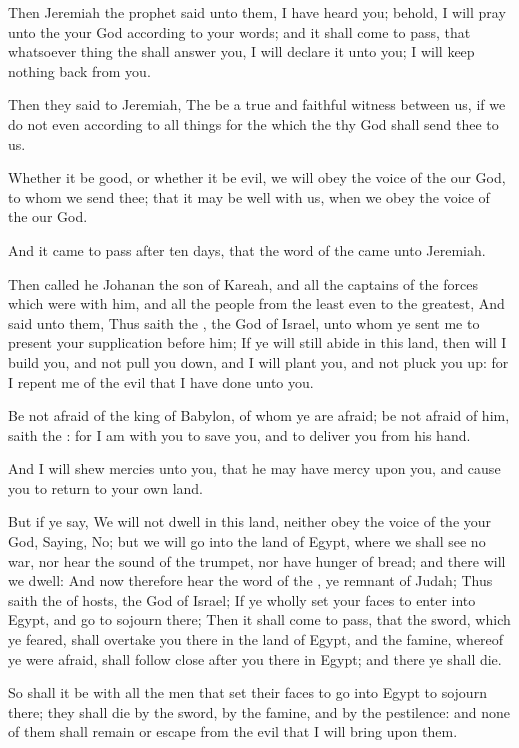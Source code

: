 \Verse Then Jeremiah the prophet said unto them, I have heard you; behold, I will pray unto the \LORD your God according to your words; and it shall come to pass, that whatsoever thing the \LORD shall answer you, I will declare it unto you; I will keep nothing back from you.

\Verse Then they said to Jeremiah, The \LORD be a true and faithful witness between us, if we do not even according to all things for the which the \LORD thy God shall send thee to us.

\Verse Whether it be good, or whether it be evil, we will obey the voice of the \LORD our God, to whom we send thee; that it may be well with us, when we obey the voice of the \LORD our God.

\Verse And it came to pass after ten days, that the word of the \LORD came unto Jeremiah.

\Verse Then called he Johanan the son of Kareah, and all the captains of the forces which were with him, and all the people from the least even to the greatest, \Verse And said unto them, Thus saith the \LORD, the God of Israel, unto whom ye sent me to present your supplication before him; \Verse If ye will still abide in this land, then will I build you, and not pull you down, and I will plant you, and not pluck you up: for I repent me of the evil that I have done unto you.

\Verse Be not afraid of the king of Babylon, of whom ye are afraid; be not afraid of him, saith the \LORD: for I am with you to save you, and to deliver you from his hand.

\Verse And I will shew mercies unto you, that he may have mercy upon you, and cause you to return to your own land.

\Verse But if ye say, We will not dwell in this land, neither obey the voice of the \LORD your God, \Verse Saying, No; but we will go into the land of Egypt, where we shall see no war, nor hear the sound of the trumpet, nor have hunger of bread; and there will we dwell: \Verse And now therefore hear the word of the \LORD, ye remnant of Judah; Thus saith the \LORD of hosts, the God of Israel; If ye wholly set your faces to enter into Egypt, and go to sojourn there; \Verse Then it shall come to pass, that the sword, which ye feared, shall overtake you there in the land of Egypt, and the famine, whereof ye were afraid, shall follow close after you there in Egypt; and there ye shall die.

\Verse So shall it be with all the men that set their faces to go into Egypt to sojourn there; they shall die by the sword, by the famine, and by the pestilence: and none of them shall remain or escape from the evil that I will bring upon them.

